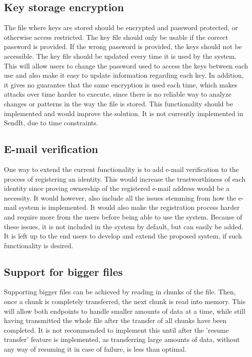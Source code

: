   \subsection{Key storage encryption}
    The file where keys are stored should be encrypted and password protected, or otherwise access restricted. The key file should only be usable if the correct password is provided. If the wrong password is provided, the keys should not be accessible. The key file should be updated every time it is used by the system. This will allow users to change the password used to access the keys between each use and also make it easy to update information regarding each key. In addition, it gives no guarantee that the same encryption is used each time, which makes attacks over time harder to execute, since there is no reliable way to analyze changes or patterns in the way the file is stored. This functionality should be implemented and would improve the solution. It is not currently implemented in SendIt, due to time constraints. 

  \subsection{E-mail verification}
    One way to extend the current functionality is to add e-mail verification to the process of registering an identity. This would increase the trustworthiness of each identity since proving ownership of the registered e-mail address would be a necessity. It would however, also include all the issues stemming from how the e-mail system is implemented. It would also make the registration process harder and require more from the users before being able to use the system. Because of these issues, it is not included in the system by default, but can easily be added. It is left up to the end users to develop and extend the proposed system, if such functionality is desired.

  \subsection{Support for bigger files}
  \label{sec:bigfile}
    Supporting bigger files can be achieved by reading in chunks of the file. Then, once a chunk is completely transferred, the next chunk is read into memory. This will allow both endpoints to handle smaller amounts of data at a time, while still having transmitted the whole file after the transfer of all chunks have been completed. It is not recommended to implement this until after the 'resume transfer' feature is implemented, as transferring large amounts of data, without any way of resuming it in case of failure, is less than optimal.

